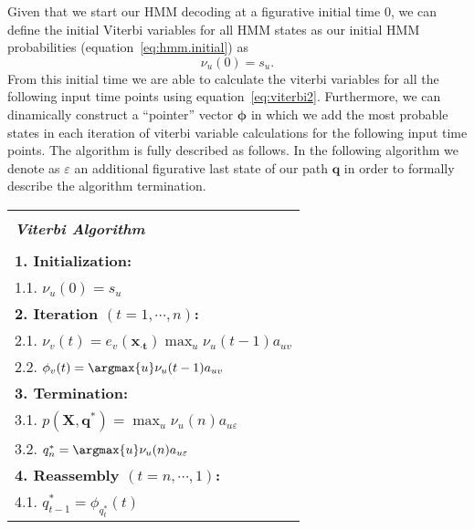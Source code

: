 Given that we start our HMM decoding at a figurative initial time $ 0 $, we can define the initial Viterbi variables for all HMM states as our initial HMM probabilities (equation~\ref{eq:hmm.initial}) as
\begin{equation}
  \label{eq:viterbi3}
  \nu_u(0) = s_u.
\end{equation}
From this initial time we are able to calculate the viterbi variables for all the following input time points using equation~\ref{eq:viterbi2}. Furthermore, we can dinamically construct a ``pointer'' vector $\boldsymbol\phi$ in which we add the most probable states in each iteration of viterbi variable calculations for the following input time points. The algorithm is fully described as follows. In the following algorithm we denote as $ \varepsilon $ an additional figurative last state of our path $ \mathbf{q} $ in order to formally describe the algorithm termination.

\begin{center}
  \begin{spacing}{1.0}
    \begin{tabular}{l}
      \hline \\[-0.25cm]
      \hspace{1.2cm} {\large {\bf \emph{ Viterbi Algorithm } } } \hspace{1.2cm} \\[0.1cm]
      \hline \\[-0.25cm]
      \hspace{0.2cm} {\bf 1. Initialization:} \\
      \hspace{0.9cm} 1.1. $ \nu_u(0) = s_u $ \\
      \hspace{0.2cm} {\bf 2. Iteration $ (t = 1, \cdots, n) $:} \\
      \hspace{0.9cm} 2.1. $ \nu_v(t) = e_v(\mathbf{{x}_{\cdot t}}) \max_{u} \nu_u(t-1)a_{uv} $ \\
      \hspace{0.9cm} 2.2. $ {\phi}_{v}(t) = \argmax{u} \nu_u(t-1) a_{uv} $ \\
      \hspace{0.2cm} {\bf 3. Termination:} \\
      \hspace{0.9cm} 3.1. $ p(\mathbf{X},\mathbf{q^*}) = \max_{u} \nu_u(n) a_{u\varepsilon} $ \\
      \hspace{0.9cm} 3.2. $ q_{n}^{\ast} = \argmax{u} \nu_u(n) a_{u\varepsilon} $ \\
      \hspace{0.2cm} {\bf 4. Reassembly $ (t = n, \cdots, 1) $:} \\
      \hspace{0.9cm} 4.1. $ q_{t-1}^{\ast} = {\phi}_{q_{t}^{\ast}}(t) $ \\[0.1cm]
      \hline
    \end{tabular}
  \end{spacing}
\end{center}

